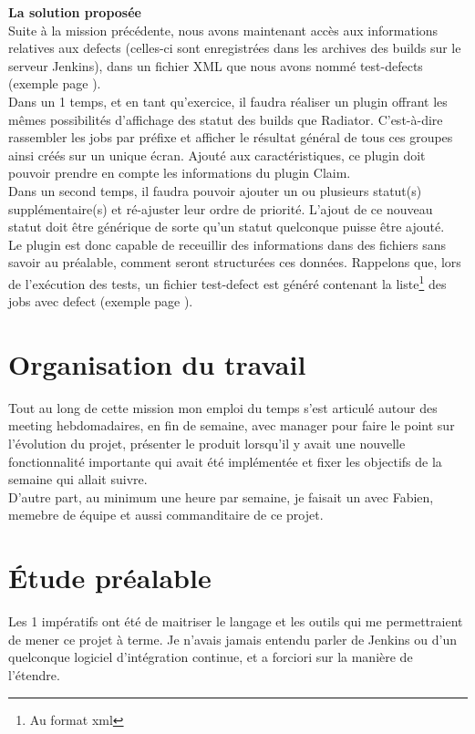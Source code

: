 \textbf{La solution propos\'{e}e}\hfill \\ \indent
Suite à la mission précédente, nous avons maintenant accès aux informations relatives aux defects (celles-ci sont enregistrées dans les archives des builds sur le serveur Jenkins), dans un fichier XML que nous avons nommé test-defects (exemple page \pageref{testdefectxml}).\\
Dans un 1 temps, et en tant qu'exercice, il faudra réaliser un plugin offrant les mêmes possibilités d'affichage des statut des builds que Radiator. C'est-à-dire rassembler les jobs par préfixe et afficher le résultat général de tous ces groupes ainsi créés sur un unique écran. Ajouté aux caractéristiques, ce plugin doit pouvoir prendre en compte les informations du plugin Claim.\\ \indent
Dans un second temps, il faudra pouvoir ajouter un ou plusieurs statut(s) supplémentaire(s) et ré-ajuster leur ordre de priorité. L'ajout de ce nouveau statut doit être générique de sorte qu'un statut quelconque puisse être ajouté.\\
Le plugin est donc capable de receuillir des informations dans des fichiers sans savoir au préalable, comment seront structurées ces données. Rappelons que, lors de l'exécution des tests, un fichier test-defect est généré contenant la liste\footnote{Au format xml} des jobs avec defect (exemple page \pageref{testdefectxml}).





\section{Organisation du travail} 
Tout au long de cette mission mon emploi du temps s'est articulé autour des meeting hebdomadaires, en fin de semaine, avec manager pour faire le point sur l'évolution du projet, présenter le produit lorsqu'il y avait une nouvelle fonctionnalité importante qui avait été implémentée et fixer les objectifs de la semaine qui allait suivre.\\
D'autre part, au minimum une heure par semaine, je faisait un  avec Fabien, memebre de équipe et aussi commanditaire de ce projet.



\section{\'{E}tude préalable}
Les 1 impératifs ont été de maitriser le langage et les outils qui me permettraient de mener ce projet à terme. Je n'avais jamais entendu parler de Jenkins ou d'un quelconque logiciel d'intégration continue, et a forciori sur la manière de l'étendre. 

